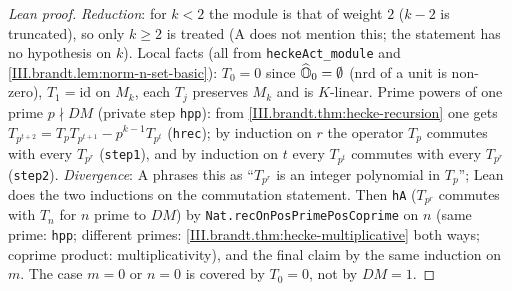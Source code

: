\begin{proof}[Lean proof]
\emph{Reduction}: for $k<2$ the module is that of weight $2$ ($k-2$ is truncated), so only $k\ge2$ is treated (A does not mention this; the statement has no hypothesis on $k$). Local facts (all from \texttt{heckeAct\_module} and \cref{III.brandt.lem:norm-n-set-basic}): $T_0=0$ since $\widehat{\mathbb{O}}_0=\emptyset$ ($\mathrm{nrd}$ of a unit is non-zero), $T_1=\mathrm{id}$ on $M_k$, each $T_j$ preserves $M_k$ and is $K$-linear. Prime powers of one prime $p\nmid DM$ (private step \texttt{hpp}): from \cref{III.brandt.thm:hecke-recursion} one gets $T_{p^{t+2}}=T_pT_{p^{t+1}}-p^{k-1}T_{p^t}$ (\texttt{hrec}); by induction on $r$ the operator $T_p$ commutes with every $T_{p^r}$ (\texttt{step1}), and by induction on $t$ every $T_{p^t}$ commutes with every $T_{p^r}$ (\texttt{step2}). \emph{Divergence}: A phrases this as ``$T_{p^r}$ is an integer polynomial in $T_p$''; Lean does the two inductions on the commutation statement. Then \texttt{hA} ($T_{p^r}$ commutes with $T_n$ for $n$ prime to $DM$) by \texttt{Nat.recOnPosPrimePosCoprime} on $n$ (same prime: \texttt{hpp}; different primes: \cref{III.brandt.thm:hecke-multiplicative} both ways; coprime product: multiplicativity), and the final claim by the same induction on $m$. The case $m=0$ or $n=0$ is covered by $T_0=0$, not by $DM=1$.
\end{proof}

